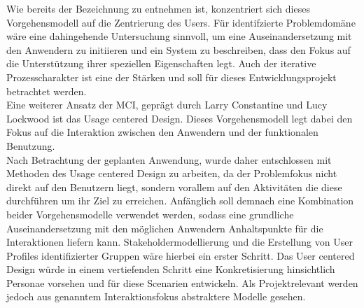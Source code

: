 Wie bereits der Bezeichnung zu entnehmen ist, konzentriert sich dieses Vorgehensmodell auf die Zentrierung des Users. Für identifzierte Problemdomäne wäre eine dahingehende Untersuchung sinnvoll, um eine  Auseinandersetzung mit den Anwendern zu initiieren und ein System zu beschreiben, dass den Fokus auf die Unterstützung ihrer speziellen Eigenschaften legt. Auch der iterative Prozesscharakter ist eine der Stärken und soll für dieses Entwicklungsprojekt betrachtet werden.\\
Eine weiterer Ansatz der MCI, geprägt durch Larry Constantine und Lucy Lockwood ist das Usage centered Design. Dieses Vorgehensmodell legt dabei den Fokus auf die Interaktion zwischen den Anwendern und der funktionalen Benutzung. \\
Nach Betrachtung der geplanten Anwendung, wurde daher entschlossen mit Methoden des Usage centered Design zu arbeiten, da der Problemfokus nicht direkt auf den Benutzern liegt, sondern vorallem auf den Aktivitäten die diese durchführen um ihr Ziel zu erreichen. Anfänglich soll demnach eine Kombination beider Vorgehensmodelle verwendet werden, sodass eine grundliche Auseinandersetzung mit den möglichen Anwendern Anhaltspunkte für die Interaktionen liefern kann. Stakeholdermodellierung und die Erstellung von User Profiles identifizierter Gruppen wäre hierbei ein erster Schritt. Das User centered Design würde in einem vertiefenden Schritt eine Konkretisierung hinsichtlich Personae vorsehen und für diese Scenarien entwickeln. Als Projektrelevant werden jedoch aus genanntem Interaktionsfokus abstraktere Modelle gesehen.





\newpage



\newpage



\newpage



\newpage



\newpage



\newpage
